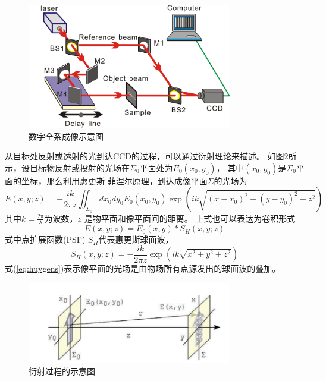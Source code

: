 \documentclass[11pt,a4paper]{article}
\begin{document}
\begin{figure}[htb]
  \centering
  \includegraphics[width=0.8\textwidth]{fig1.png}
  \caption{数字全系成像示意图}
  \label{fig:dh}
\end{figure}

从目标处反射或透射的光到达CCD的过程，可以通过衍射理论来描述。
如图\ref{fig:diffraction}所示，设目标物反射或投射的光场在$\Sigma_0$平面处为$E_0(x_0,y_0)$，
其中$(x_0, y_0)$是$\Sigma_0$平面的坐标，那么利用惠更斯-菲涅尔原理，到达成像平面$\Sigma$的光场为
\begin{equation}
E(x, y; z) = - \frac{i k}{2 \pi z} \iint_{\Sigma_0} dx_0 dy_0 E_0(x_0,y_0) \exp(i k \sqrt{(x-x_0)^2+(y-y_0)^2+z^2})
\label{eq:huygens}
\end{equation}
其中$k=\frac{2 \pi}{\lambda}$为波数，$z$ 是物平面和像平面间的距离。
上式也可以表达为卷积形式
\begin{equation}
E(x,y; z) = E_0(x , y) \ast S_H(x, y; z)
\end{equation}
式中点扩展函数(PSF) $S_H$代表惠更斯球面波，
\begin{equation}
S_H(x, y; z) =  - \frac{i k}{2 \pi z} \exp(i k \sqrt{x^2+y^2+z^2})
\end{equation}
式(\ref{eq:huygens})表示像平面的光场是由物场所有点源发出的球面波的叠加。

\begin{figure}[htb]
  \centering
  \includegraphics[width=0.8\textwidth]{diffraction.png}
  \caption{衍射过程的示意图}
  \label{fig:diffraction}
\end{figure}
\end{document}
